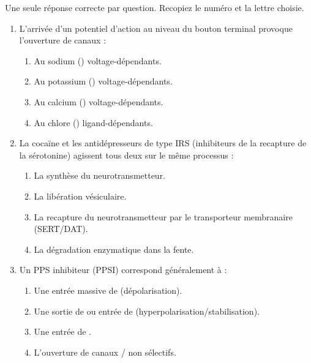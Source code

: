 \documentclass[11pt]{article}
\begin{document}
\begin{exercice}
Une seule réponse correcte par question. Recopiez le numéro et la lettre choisie.
\begin{enumerate}
    \item L'arrivée d'un potentiel d'action au niveau du bouton terminal provoque l'ouverture de canaux :
    \begin{enumerate}
        \item Au sodium () voltage-dépendants.
        \item Au potassium () voltage-dépendants.
        \item Au calcium () voltage-dépendants.
        \item Au chlore () ligand-dépendants.
    \end{enumerate}
    \item La cocaïne et les antidépresseurs de type IRS (inhibiteurs de la recapture de la sérotonine) agissent tous deux sur le même processus : 
    \begin{enumerate}
        \item La synthèse du neurotransmetteur.
        \item La libération vésiculaire.
        \item La recapture du neurotransmetteur par le transporteur membranaire (SERT/DAT).
        \item La dégradation enzymatique dans la fente.
    \end{enumerate}
    \item Un PPS inhibiteur (PPSI) correspond généralement à :
    \begin{enumerate}
        \item Une entrée massive de  (dépolarisation).
        \item Une sortie de  ou entrée de  (hyperpolarisation/stabilisation).
        \item Une entrée de .
        \item L'ouverture de canaux / non sélectifs.
    \end{enumerate}
\end{enumerate}
\end{exercice}
\end{document}
